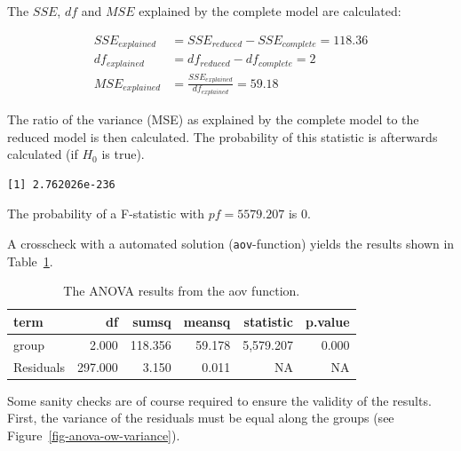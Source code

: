 \documentclass[
  a4paper,
]{scrbook}
\begin{document}
The \(SSE\), \(df\) and \(MSE\) explained by the complete model are
calculated:

\begin{align}
SSE_{explained} &= SSE_{reduced}-SSE_{complete} = 118.36 \\
df_{explained} &= df_{reduced} - df_{complete} = 2 \\
MSE_{explained} &= \frac{SSE_{explained}}{df_{explained}} = 59.18
\end{align}

The ratio of the variance (MSE) as explained by the complete model to
the reduced model is then calculated. The probability of this statistic
is afterwards calculated (if \(H_0\) is true).

\begin{verbatim}
[1] 2.762026e-236
\end{verbatim}

The probability of a F-statistic with \(pf = 5579.207\) is \(0\).

A crosscheck with a automated solution (\texttt{aov}-function) yields
the results shown in Table~\ref{tbl-anova-ow-r-sol}.

\begin{longtable}[]{@{}lrrrrr@{}}

\caption{\label{tbl-anova-ow-r-sol}The ANOVA results from the aov
function.}

\tabularnewline

\toprule\noalign{}
term & df & sumsq & meansq & statistic & p.value \\
\midrule\noalign{}
\endhead
\bottomrule\noalign{}
\endlastfoot
group & 2.000 & 118.356 & 59.178 & 5,579.207 & 0.000 \\
Residuals & 297.000 & 3.150 & 0.011 & NA & NA \\

\end{longtable}

Some sanity checks are of course required to ensure the validity of the
results. First, the variance of the residuals must be equal along the
groups (see Figure~\ref{fig-anova-ow-variance}).
\end{document}
